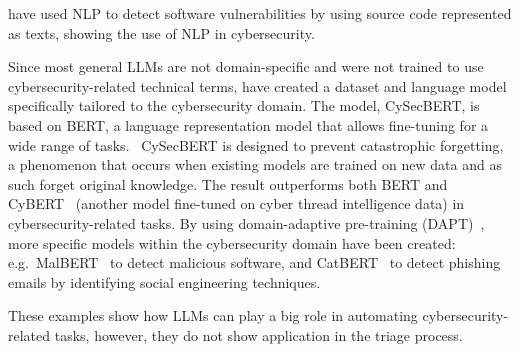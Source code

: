 \citet{singh2022cyber} have used NLP to detect software vulnerabilities by using source code represented as texts,
showing the use of NLP in cybersecurity.

Since most general LLMs are not domain-specific and were not trained to use cybersecurity-related technical terms,
\citet{bayer2024cysecbert} have created a dataset and language model specifically tailored to the cybersecurity domain.
The model, CySecBERT, is based on BERT, a language representation model that allows fine-tuning for a wide range of
tasks.\ \citep{devlin2018bert}
CySecBERT is designed to prevent catastrophic forgetting, a phenomenon that occurs when existing models are trained on
new data and as such forget original knowledge.
The result outperforms both BERT and CyBERT\ \citep{ranade2021cybert} (another model fine-tuned on cyber thread intelligence data)
in cybersecurity-related tasks.
By using domain-adaptive pre-training (DAPT)\ \citep{gururangan2020don}, more specific models within the cybersecurity
domain have been created: e.g.\ MalBERT\ \citep{rahali2021malbert} to detect malicious software, and CatBERT\ \citep{lee2020catbert}
to detect phishing emails by identifying social engineering techniques.

These examples show how LLMs can play a big role in automating cybersecurity-related tasks, however, they do not show
application in the triage process.